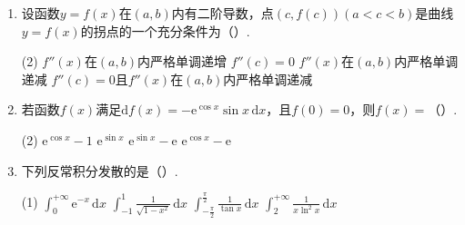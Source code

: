 \documentclass[../Main.tex]{subfiles}
\begin{document}
\begin{enumerate}
    \item 设函数$y=f(x)$在$(a,b)$内有二阶导数，点$(c,f(c))(a<c<b)$是曲线$y=f(x)$的拐点的一个充分条件为（\qquad）.

          \begin{tasks}[label=\textbf{\Alph*.}, label-width=1.5em, column-sep=1em](2)
              \task $f''(x)$在$(a,b)$内严格单调递增
              \task $f''(c)=0$
              \task $f''(x)$在$(a,b)$内严格单调递减
              \task $f''(c)=0$且$f''(x)$在$(a,b)$内严格单调递减
          \end{tasks}
          \vspace{1em}

    \item 若函数$f(x)$满足$\mathrm{d}f(x)=-\mathrm{e}^{\cos x}\sin x\,\mathrm{d}x$，且$f
              (0)=0$，则$f(x)=$（\qquad）.

          \begin{tasks}[label=\textbf{\Alph*.}, label-width=1.5em, column-sep=1em](2)
              \task $\mathrm{e}^{\cos x}-1$
              \task $\mathrm{e}^{\sin x}$
              \task $\mathrm{e}^{\sin x}-\mathrm{e}$
              \task $\mathrm{e}^{\cos x}-\mathrm{e}$
          \end{tasks}
          \vspace{1em}

    \item 下列反常积分发散的是（\qquad）.

          \begin{tasks}[label=\textbf{\Alph*.}, label-width=1.5em, column-sep=1em](1)
              \task $\int_{0}^{+\infty}\mathrm{e}^{-x}\,\mathrm{d}x$
              \task $\int_{-1}^{1}\frac{1}{\sqrt{1-x^{2}}}\,\mathrm{d}x$
              \task $\int_{-\frac{\pi}{2}}^{\frac{\pi}{2}}\frac{1}{\tan x}\,\mathrm{d}x$
              \task $\int_{2}^{+\infty}\frac{1}{x\ln^{2} x}\,\mathrm{d}x$
          \end{tasks}
          \vspace{1em}
\end{enumerate}
\end{document}
